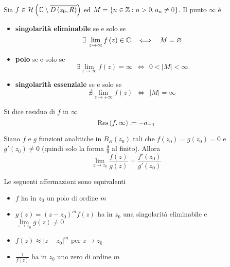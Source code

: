 \begin{thm}
Sia $f\in \mathcal{H} \left(\mathbb{C}  \setminus \overline{D\left(z_{0} ,R\right)}\right)$ ed $M = \left\{n\in \mathbb{Z}  :n > 0,a_{n} \neq 0\right\}$. Il punto $\infty $ è

\begin{itemize}
\item \textbf{singolarità eliminabile} se e solo se
\begin{equation*}
\exists \lim\limits _{z\rightarrow \infty } f\left(z\right) \in \CC  \ \ \iff \ \ M = \emptyset 
\end{equation*}
\item \textbf{polo} se e solo se
\begin{equation*}
\exists \lim\limits _{z\rightarrow \infty } f\left(z\right) = \infty \ \ \iff \ \ 0 < \left| M\right| < \infty 
\end{equation*}
\item \textbf{singolarità essenziale} se e solo se
\begin{equation*}
\nexists \lim\limits _{z\rightarrow + \infty } f\left(z\right) \ \ \iff \ \ \left| M\right| = \infty 
\end{equation*}
\end{itemize}
\end{thm}
\begin{defn}
Si dice residuo di $f$ in $\infty $
\begin{equation*}
\operatorname{Res} \left(f,\infty \right) \coloneqq - a_{ - 1}
\end{equation*}
\end{defn}
\begin{thm}
[di De l'Hôpital] Siano $f$ e $g$ funzioni analitiche in $B_{R}\left(z_{0}\right)$ tali che $f\left(z_{0}\right) = g\left(z_{0}\right) = 0$ e $g'\left(z_{0}\right) \neq 0$ (quindi solo la forma $\frac{0}{0}$ al finito). Allora
\begin{equation*}
\lim\limits _{z\rightarrow z_{0}}\frac{f\left(z\right)}{g\left(z\right)} = \frac{f'\left(z_{0}\right)}{g'\left(z_{0}\right)}
\end{equation*}
\end{thm}
\begin{thm}
Le seguenti affermazioni sono equivalenti
\begin{itemize}
\item $f$ ha in $z_{0}$ un polo di ordine $m$
\item $g\left(z\right) = \left(z - z_{0}\right)^{m} f\left(z\right)$ ha in $z_{0}$ una singolarità eliminabile e $\lim\limits _{z\rightarrow z_{0}} g\left(z\right) \neq 0$
\item $f\left(z\right) \approx \left| z - z_{0}\right| ^{m}$ per $z\rightarrow z_{0}$
\item $\frac{1}{f\left(z\right)}$ ha in $z_{0}$ uno zero di ordine $m$
\end{itemize}
\end{thm}
